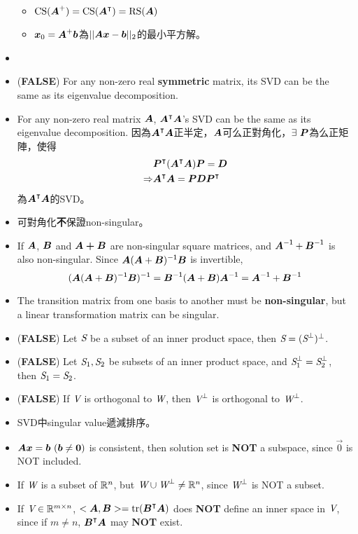 \begin{itemize}
\begin{itemize}
		\item $\operatorname{CS}(\boldsymbol{A}^+) = \operatorname{CS}(\boldsymbol{A}^\intercal) = \operatorname{RS}(\boldsymbol{A})$
		\item $\boldsymbol{x}_0 = \boldsymbol{A}^+ \boldsymbol{b}$為$||\boldsymbol{A}\boldsymbol{x} - \boldsymbol{b}||_2$的最小平方解。
    \end{itemize}
    \item \item (\textbf{FALSE}) For any non-zero real \textbf{symmetric} matrix, its SVD can be the same as its eigenvalue decomposition.
    \item For any non-zero real matrix $\boldsymbol{A}$, $\boldsymbol{A}^\intercal\boldsymbol{A}$'s SVD can be the same as its eigenvalue decomposition. 
    因為$\boldsymbol{A}^\intercal\boldsymbol{A}$正半定，$\boldsymbol{A}$可么正對角化，$\exists \ \boldsymbol{P}$為么正矩陣，使得 \begin{equation}
        \begin{aligned}
            & \boldsymbol{P}^\intercal(\boldsymbol{A}^\intercal\boldsymbol{A})\boldsymbol{P} = \boldsymbol{D} \\
            \Rightarrow & \boldsymbol{A}^\intercal\boldsymbol{A} = \boldsymbol{P}\boldsymbol{D}\boldsymbol{P}^\intercal
        \end{aligned} 
    \end{equation} 為$\boldsymbol{A}^\intercal\boldsymbol{A}$的SVD。
    \item 可對角化\textbf{不}保證non-singular。
    \item If $\boldsymbol{A}$, $\boldsymbol{B}$ and $\boldsymbol{A + B}$ are non-singular square matrices, and $\boldsymbol{A}^{\mathsf{-1}} + \boldsymbol{B}^{\mathsf{-1}}$ is also non-singular.
    Since $\boldsymbol{A}(\boldsymbol{A} + \boldsymbol{B})^{\mathsf{-1}}\boldsymbol{B}$ is invertible, \begin{equation}
        (\boldsymbol{A}(\boldsymbol{A} + \boldsymbol{B})^{\mathsf{-1}}\boldsymbol{B})^{\mathsf{-1}} = \boldsymbol{B}^{\mathsf{-1}}(\boldsymbol{A} + \boldsymbol{B})\boldsymbol{A}^{\mathsf{-1}} = \boldsymbol{A}^{\mathsf{-1}} + \boldsymbol{B}^{\mathsf{-1}}
    \end{equation}
    \item The transition matrix from one basis to another must be \textbf{non-singular}, but a linear transformation matrix can be singular.
    \item (\textbf{FALSE}) Let $\textit{S}$ be a subset of an inner product space, then $\textit{S} = (\textit{S}^{\bot})^{\bot}$.
    \item (\textbf{FALSE}) Let $\textit{S}_1, \textit{S}_2$ be subsets of an inner product space, and $\textit{S}_1^{\bot} = \textit{S}_2^{\bot}$, then $\textit{S}_1 = \textit{S}_2$.
    \item (\textbf{FALSE}) If $\textit{V}$ is orthogonal to $\textit{W}$, then $\textit{V}^\bot$ is orthogonal to $\textit{W}^\bot$.
    \item SVD中singular value遞減排序。
    \item $\boldsymbol{A}\boldsymbol{x} = \boldsymbol{b} \ (\boldsymbol{b} \neq \boldsymbol{0})$ is consistent, then solution set is \textbf{NOT} a subspace, since $\vec{0}$ is NOT included.
    \item If $\textit{W}$ is a subset of $\mathbb{R}^n$, but $\textit{W} \cup \textit{W}^\perp \neq \mathbb{R}^n$, since $\textit{W}^\perp$ is NOT a subset.
    \item If $\textit{V} \in \mathbb{R}^{m \times n}$, $<\boldsymbol{A}, \boldsymbol{B}> = \operatorname{tr}(\boldsymbol{B}^\intercal\boldsymbol{A})$ does \textbf{NOT} define an inner space in $\textit{V}$, since if $m \neq n$, $\boldsymbol{B}^\intercal\boldsymbol{A}$ may \textbf{NOT} exist.
\end{itemize}

\pagebreak
